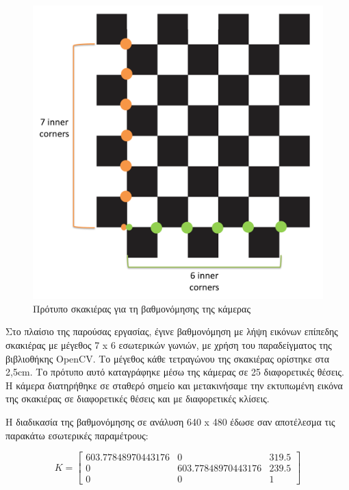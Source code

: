 \begin{figure}[H]
    \centering
    \includegraphics[scale=0.3, angle=0]{Files/Figures/pattern.pdf}
    \caption[Πρότυπο σκακιέρας για τη βαθμονόμησης της κάμερας]{Πρότυπο σκακιέρας για τη βαθμονόμησης της κάμερας}
    \label{fig:pattern}
\end{figure}




Στο πλαίσιο της παρούσας εργασίας, έγινε βαθμονόμηση με λήψη εικόνων επίπεδης σκακιέρας με μέγεθος 7 x 6 εσωτερικών γωνιών, με χρήση του παραδείγματος της βιβλιοθήκης OpenCV. Το μέγεθος κάθε τετραγώνου της σκακιέρας ορίστηκε στα 2,5cm. Το πρότυπο αυτό καταγράφηκε μέσω της κάμερας σε 25 διαφορετικές θέσεις. Η κάμερα διατηρήθηκε σε σταθερό σημείο και μετακινήσαμε την εκτυπωμένη εικόνα της σκακιέρας σε διαφορετικές θέσεις και με διαφορετικές κλίσεις. 






Η διαδικασία της βαθμονόμησης σε ανάλυση 640 x 480 έδωσε σαν αποτέλεσμα τις παρακάτω εσωτερικές παραμέτρους:


\begin{equation}
K=
\begin{bmatrix}
603.77848970443176 & 0 & 319.5\\
0 & 603.77848970443176 & 239.5\\
0 & 0 & 1
\end{bmatrix}
\end{equation}

